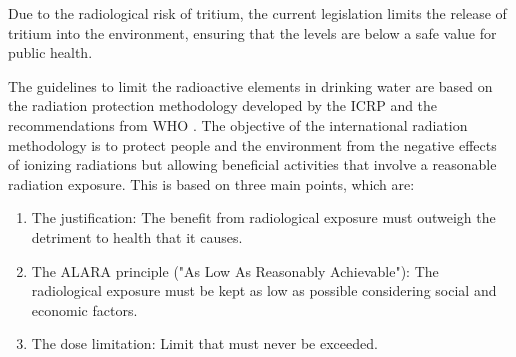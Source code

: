 Due to the radiological risk of tritium, the current legislation limits the release of tritium into the environment, ensuring that the levels are below a safe value for public health.

The guidelines to limit the radioactive elements in drinking water are based on the radiation protection methodology developed by the ICRP \cite{ICRP_GL} and the recommendations from WHO \cite{WHO_GL}. The objective of the international radiation methodology is to  protect people and the environment from the negative effects of ionizing radiations but allowing beneficial activities that involve a reasonable radiation exposure. This is based on three main points, which are:
\begin{enumerate}
\item{} The justification: The benefit from radiological exposure must outweigh the detriment to health that it causes.
\item{} The ALARA principle ("As Low As Reasonably Achievable"): The radiological exposure must be kept as low as possible considering social and economic factors.
\item{} The dose limitation: Limit that must never be exceeded.
\end{enumerate}

